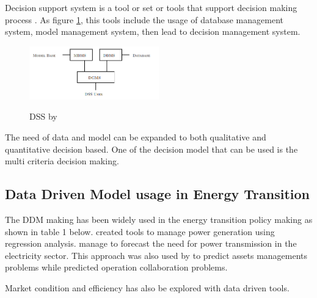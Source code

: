 Decision support system is a tool or set or tools that support decision making process \citep{Keen1980DecisionAnalysis, Sprague1980ASystems}. As figure \ref{fig:DSS framework}, this tools include the usage of database management system, model management system, then lead to decision management system. 

        \begin{figure}[htbp!]
        \caption{DSS by \citet{Sage1984BehavioralSupport}}
        \centering
            \includegraphics[width=0.5\textwidth]{Images/Decision/DSS by Sage 1991.PNG}
            \label{fig:DSS framework}
        \end{figure}

The need of data and model can be expanded to both qualitative and quantitative decision based. One of the decision model that can be used is the multi criteria decision making. 

\subsection{Data Driven Model usage in Energy Transition}
The DDM making has been widely used in the energy transition policy making as shown in table 1 below. \citep{Zhou2016BigInsights, Nashawi2010ForecastingModel, Yan2019Data-drivenSearch,Bukhsh2018TowardsGrid,Wu2019OptimalApproach,Wang2020ASources,ClimateCouncil2019ClimateAgreement,Singhal2019AResources} created tools to manage power generation using regression analysis. \citep{Guo2019Data-basedStudies,Ma2018ForecastingAssumptions,Mehrtash2018Security-ConstrainedData, Wang2020ASources} manage to forecast the need for power transmission in the electricity sector. This approach was also used by \citep{Zhou2016BigInsights,Godwin2013ClassificationAnalysis,Sharma2019AssessmentFramework} to predict assets managements problems while  \citep{Zhou2016BigInsights,Godwin2013ClassificationAnalysis,Wang2020ASources} predicted operation collaboration problems. 

Market condition \citep{Nashawi2010ForecastingModel, Silvapulle2017NonparametricCountries, Singham2015OptimalLevels, Wu2019OptimalApproach, Khezeli2016Data-drivenResponse} and efficiency \citep{Hong2014DataBuildings, Kontokosta2017ABuildings, Papadopoulos2019GradingData} has also be explored with data driven tools. 

